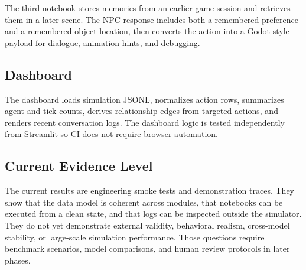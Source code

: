 The third notebook stores memories from an earlier game session and retrieves them in a later scene. The NPC response includes both a remembered preference and a remembered object location, then converts the action into a Godot-style payload for dialogue, animation hints, and debugging.

\subsection{Dashboard}

The dashboard loads simulation JSONL, normalizes action rows, summarizes agent and tick counts, derives relationship edges from targeted actions, and renders recent conversation logs. The dashboard logic is tested independently from Streamlit so CI does not require browser automation.

\subsection{Current Evidence Level}

The current results are engineering smoke tests and demonstration traces. They show that the data model is coherent across modules, that notebooks can be executed from a clean state, and that logs can be inspected outside the simulator. They do not yet demonstrate external validity, behavioral realism, cross-model stability, or large-scale simulation performance. Those questions require benchmark scenarios, model comparisons, and human review protocols in later phases.
